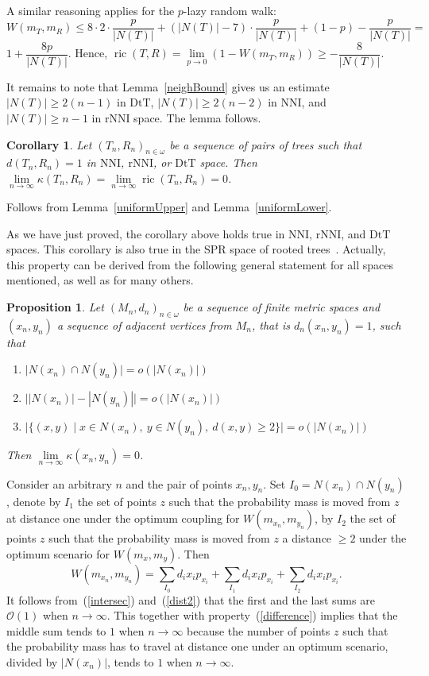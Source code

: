 \documentclass{amsart}
\newtheorem{proposition}[lemma]{Proposition}
\newtheorem{corollary}[lemma]{Corollary}
\newcommand{\nni}{\mathrm{NNI}}
\newcommand{\rnni}{\mathrm{rNNI}}
\newcommand{\mdts}{\mathrm{DtT}}
\newcommand{\ric}{\operatorname{ric}}
\renewcommand{\O}{\mathcal{O}}
\begin{document}
A similar reasoning applies for the $p$-lazy random walk:
\[
W(m_T,m_R)\leq 8 \cdot 2 \cdot \frac{p}{|N(T)|} +
(|N(T)| - 7) \cdot \frac{p}{|N(T)|} + (1-p) - \frac{p}{|N(T)|} =
\]
$1 + \dfrac{8p}{|N(T)|}$.
Hence, $\ric(T,R) = \lim\limits_{p\to0}\left(1 - W(m_T,m_R)\right) \geq - \dfrac{8}{|N(T)|}$.

It remains to note that Lemma~\ref{neighBound} gives us an estimate $|N(T)| \geq 2(n-1)$ in $\mdts$, $|N(T)| \geq 2(n-2)$ in $\nni$, and $|N(T)| \geq n-1$ in $\rnni$ space.
The lemma follows.
\endproof

\begin{corollary}\label{flatInLimDTS}
Let $(T_n,R_n)_{n\in\omega}$ be a sequence of pairs of trees such that $d(T_n,R_n) = 1$ in $\nni$, $\rnni$, or $\mdts$ space.
Then $\lim\limits_{n \to \infty}\kappa(T_n,R_n) = \lim\limits_{n \to \infty}\ric(T_n,R_n) = 0$.
\end{corollary}

\proof
Follows from Lemma~\ref{uniformUpper} and Lemma~\ref{uniformLower}.
\endproof

As we have just proved, the corollary above holds true in $\nni$, $\rnni$, and $\mdts$ spaces.
This corollary is also true in the SPR space of rooted trees~\cite{Whidden2015-es}.
Actually, this property can be derived from the following general statement for all spaces mentioned, as well as for many others.

\begin{proposition}\label{flatInLimGen}
Let $(M_n,d_n)_{n \in \omega}$ be a sequence of finite metric spaces and $(x_n, y_n)$ a sequence of adjacent vertices from $M_n$, that is $d_n(x_n,y_n) = 1$, such that
\begin{enumerate}[(1)]
\item\label{intersec} $\big|N(x_n) \cap N(y_n)\big| = o(|N(x_n)|)$
\item\label{difference} $\big||N(x_n)| - |N(y_n)|\big| = o(|N(x_n)|)$
\item\label{dist2} $\big|\{(x,y) \mid
	x \in N(x_n),~ y \in N(y_n),~ d(x, y) \geq 2\}\big| = o(|N(x_n)|)$
\end{enumerate}

Then $\lim\limits_{n \to \infty} \kappa(x_n, y_n) = 0$.
\end{proposition}

\proof
Consider an arbitrary $n$ and the pair of points $x_n,y_n$.
Set $I_0 = N(x_n) \cap N(y_n)$, denote by $I_1$ the set of points $z$ such that the probability mass is moved from $z$ at distance one under the optimum coupling for $W(m_{x_n},m_{y_n})$, by $I_2$ the set of points $z$ such that the probability mass is moved from $z$ a distance $\geq 2$ under the optimum scenario for $W(m_x,m_y)$.
Then
\[
W(m_{x_n},m_{y_n}) = \sum_{I_0} d_i x_i p_{x_i} + \sum_{I_1} d_i x_i p_{x_i} +
\sum_{I_2} d_i x_i p_{x_i}.
\]
It follows from~(\ref{intersec}) and~(\ref{dist2}) that the first and the last sums are $\O(1)$ when $n\to\infty$.
This together with property~(\ref{difference}) implies that the middle sum tends to $1$ when $n\to\infty$ because the number of points $z$ such that the probability mass has to travel at distance one under an optimum scenario, divided by $|N(x_n)|$, tends to $1$ when $n\to\infty$.
\endproof
\end{document}
